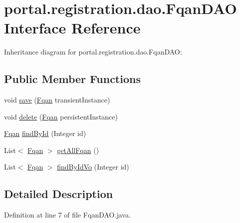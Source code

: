 \hypertarget{interfaceportal_1_1registration_1_1dao_1_1FqanDAO}{
\section{portal.registration.dao.FqanDAO Interface Reference}
\label{interfaceportal_1_1registration_1_1dao_1_1FqanDAO}
}


Inheritance diagram for portal.registration.dao.FqanDAO:
\subsection*{Public Member Functions}
\begin{DoxyCompactItemize}
\item 
void \hyperlink{interfaceportal_1_1registration_1_1dao_1_1FqanDAO_af4188ed24459d62d80cd6fca356cf93e}{save} (\hyperlink{classportal_1_1registration_1_1domain_1_1Fqan}{Fqan} transientInstance)
\item 
void \hyperlink{interfaceportal_1_1registration_1_1dao_1_1FqanDAO_a3591404c6a1507fcc4c9fb2fa5393c21}{delete} (\hyperlink{classportal_1_1registration_1_1domain_1_1Fqan}{Fqan} persistentInstance)
\item 
\hyperlink{classportal_1_1registration_1_1domain_1_1Fqan}{Fqan} \hyperlink{interfaceportal_1_1registration_1_1dao_1_1FqanDAO_ac15041f9e33cc8f54f685a1724f19896}{findById} (Integer id)
\item 
List$<$ \hyperlink{classportal_1_1registration_1_1domain_1_1Fqan}{Fqan} $>$ \hyperlink{interfaceportal_1_1registration_1_1dao_1_1FqanDAO_ace2743b3402de69776ab0c5250fb17a2}{getAllFqan} ()
\item 
List$<$ \hyperlink{classportal_1_1registration_1_1domain_1_1Fqan}{Fqan} $>$ \hyperlink{interfaceportal_1_1registration_1_1dao_1_1FqanDAO_a76a4e62e16f357337742feb6ab275bfd}{findByIdVo} (Integer id)
\end{DoxyCompactItemize}


\subsection{Detailed Description}


Definition at line 7 of file FqanDAO.java.



